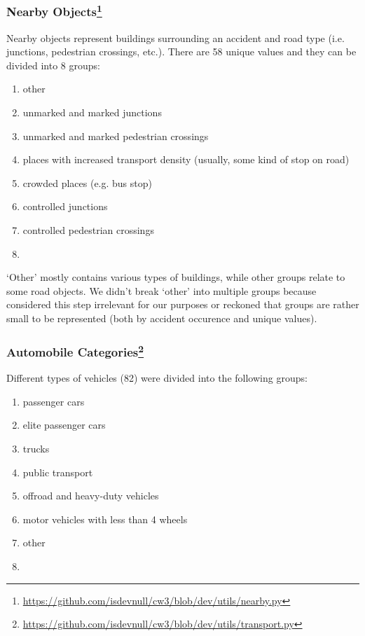 \subsubsection[Nearby Objects]{Nearby Objects\footnote{\href{https://github.com/isdevnull/cw3/blob/dev/utils/nearby.py}
{https://github.com/isdevnull/cw3/blob/dev/utils/nearby.py}}}
Nearby objects represent buildings surrounding an accident and road type (i.e. junctions, pedestrian crossings, etc.).
There are 58 unique values and they can be divided into 8 groups:
\begin{multicols}{2}
\begin{enumerate}[noitemsep]
	\item other
	\item unmarked and marked junctions
	\item unmarked and marked pedestrian crossings
	\item places with increased transport density (usually, some kind of stop on road)
	\item crowded places (e.g. bus stop)
	\item controlled junctions
	\item controlled pedestrian crossings
	\item[\vspace{\fill}]
\end{enumerate}
\end{multicols}
`Other' mostly contains various types of buildings, while other groups relate to some road objects.
We didn't break `other' into multiple groups because considered this step irrelevant for our purposes or
reckoned that groups are rather small to be represented (both by accident occurence and unique values).
\subsubsection[Automobile Categories]{Automobile Categories\footnote{\href{ttps://github.com/isdevnull/cw3/blob/dev/utils/transport.py}
{https://github.com/isdevnull/cw3/blob/dev/utils/transport.py}}}
Different types of vehicles (82) were divided into the following groups:
\begin{multicols}{2}
\begin{enumerate}[noitemsep]
	\item passenger cars
	\item elite passenger cars
	\item trucks
	\item public transport
	\item offroad and heavy-duty vehicles
	\item motor vehicles with less than 4 wheels
	\item other
	\item[\vspace{\fill}]
\end{enumerate}
\end{multicols}
